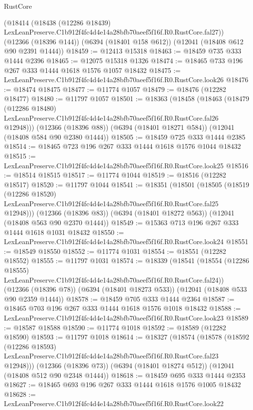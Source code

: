\begin{lexlean}{RustCore}
\begin{coremodule}
    (@18414
      (@18438 (@12286 @18439) LexLeanPreserve.C1b912f4fc4d4e14a28bfb70aeef5f16f.R0.RustCore.fal27))
    (@12366 (@18396 @144))
    (@6394 (@18401 @158 @612))
    (@12041 (@18408 @612 @90 @2391 @1444))
@18459 := @12413 @15318
@18463 := @18459 @735 @333 @1444 @2396
@18465 := @12075 @15318 @1326
@18474 := @18465 @733 @196 @267 @333 @1444 @1618 @1576 @1057 @18432
@18475 := LexLeanPreserve.C1b912f4fc4d4e14a28bfb70aeef5f16f.R0.RustCore.look26
@18476 := @18474 @18475
@18477 := @11774 @1057
@18479 := @18476 (@12282 @18477)
@18480 := @11797 @1057
@18501 := @18363
    (@18458
      (@18463
        (@18479
          (@12286 @18480)
          LexLeanPreserve.C1b912f4fc4d4e14a28bfb70aeef5f16f.R0.RustCore.fal26
          @12948)))
    (@12366 (@18396 @88))
    (@6394 (@18401 @18271 @584))
    (@12041 (@18408 @584 @90 @2380 @1444))
@18505 := @18459 @725 @333 @1444 @2385
@18514 := @18465 @723 @196 @267 @333 @1444 @1618 @1576 @1044 @18432
@18515 := LexLeanPreserve.C1b912f4fc4d4e14a28bfb70aeef5f16f.R0.RustCore.look25
@18516 := @18514 @18515
@18517 := @11774 @1044
@18519 := @18516 (@12282 @18517)
@18520 := @11797 @1044
@18541 := @18351
    (@18501
      (@18505
        (@18519
          (@12286 @18520)
          LexLeanPreserve.C1b912f4fc4d4e14a28bfb70aeef5f16f.R0.RustCore.fal25
          @12948)))
    (@12366 (@18396 @83))
    (@6394 (@18401 @18272 @563))
    (@12041 (@18408 @563 @90 @2370 @1444))
@18549 := @15363 @713 @196 @267 @333 @1444 @1618 @1031 @18432
@18550 := LexLeanPreserve.C1b912f4fc4d4e14a28bfb70aeef5f16f.R0.RustCore.look24
@18551 := @18549 @18550
@18552 := @11774 @1031
@18554 := @18551 (@12282 @18552)
@18555 := @11797 @1031
@18574 := @18339
    (@18541
      (@18554 (@12286 @18555) LexLeanPreserve.C1b912f4fc4d4e14a28bfb70aeef5f16f.R0.RustCore.fal24))
    (@12366 (@18396 @78))
    (@6394 (@18401 @18273 @533))
    (@12041 (@18408 @533 @90 @2359 @1444))
@18578 := @18459 @705 @333 @1444 @2364
@18587 := @18465 @703 @196 @267 @333 @1444 @1618 @1576 @1018 @18432
@18588 := LexLeanPreserve.C1b912f4fc4d4e14a28bfb70aeef5f16f.R0.RustCore.look23
@18589 := @18587 @18588
@18590 := @11774 @1018
@18592 := @18589 (@12282 @18590)
@18593 := @11797 @1018
@18614 := @18327
    (@18574
      (@18578
        (@18592
          (@12286 @18593)
          LexLeanPreserve.C1b912f4fc4d4e14a28bfb70aeef5f16f.R0.RustCore.fal23
          @12948)))
    (@12366 (@18396 @73))
    (@6394 (@18401 @18274 @512))
    (@12041 (@18408 @512 @90 @2348 @1444))
@18618 := @18459 @695 @333 @1444 @2353
@18627 := @18465 @693 @196 @267 @333 @1444 @1618 @1576 @1005 @18432
@18628 := LexLeanPreserve.C1b912f4fc4d4e14a28bfb70aeef5f16f.R0.RustCore.look22

\end{coremodule}
\end{lexlean}
